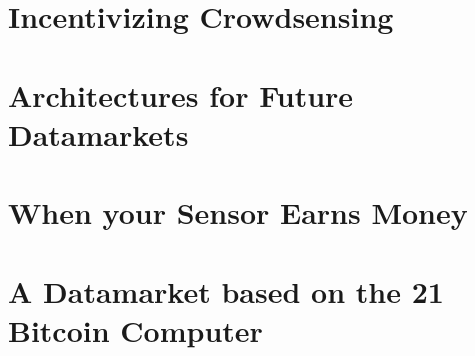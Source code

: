 \section{Incentivizing Crowdsensing}

\section{Architectures for Future Datamarkets}

\section{When your Sensor Earns Money}


\section{A Datamarket based on the 21 Bitcoin Computer}

